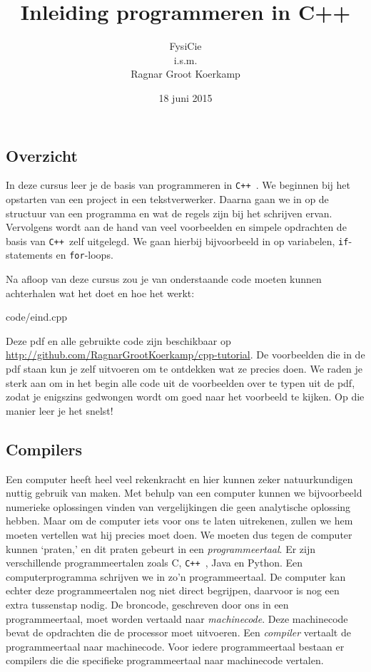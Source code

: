 \documentclass[12pt,a4paper]{article}
\title{Inleiding programmeren in C++}
\author{
FysiCie\\
i.s.m.\\
Ragnar Groot Koerkamp
}
\date{18 juni 2015}
\newcommand{\code}{}
\newcommand{\icode}{\lstinline}
\newcommand{\mono}{\texttt}
\newcommand{\cpp}{\mono{C++ }}
\begin{document}
 
\maketitle

\tableofcontents

\clearpage
\subsection{Overzicht}
In deze cursus leer je de basis van programmeren in \cpp. We beginnen bij het opstarten van een project in een tekstverwerker. Daarna gaan we in op de structuur van een programma en wat de regels zijn bij het schrijven ervan. Vervolgens wordt aan de hand van veel voorbeelden en simpele opdrachten de basis van \cpp zelf	 uitgelegd. We gaan hierbij bijvoorbeeld in op variabelen, \icode{if}-statements en \icode{for}-loops.

Na afloop van deze cursus zou je van onderstaande code moeten kunnen achterhalen wat het doet en hoe het werkt:

\code{code/eind.cpp}

Deze pdf en alle gebruikte code zijn beschikbaar op \url{http://github.com/RagnarGrootKoerkamp/cpp-tutorial}. De voorbeelden die in de pdf staan kun je zelf uitvoeren om te ontdekken wat ze precies doen. We raden je sterk aan om in het begin alle code uit de voorbeelden over te typen uit de pdf, zodat je enigszins gedwongen wordt om goed naar het voorbeeld te kijken. Op die manier leer je het snelst! 

\subsection{Compilers}
Een computer heeft heel veel rekenkracht en hier kunnen zeker natuurkundigen nuttig gebruik van maken. Met behulp van een computer kunnen we bijvoorbeeld numerieke oplossingen vinden van vergelijkingen die geen analytische oplossing hebben. Maar om de computer iets voor ons te laten uitrekenen, zullen we hem moeten vertellen wat hij precies moet doen. We moeten dus tegen de computer kunnen `praten,' en dit praten gebeurt in een \emph{programmeertaal}. Er zijn verschillende programmeertalen zoals C, {\cpp,} Java en Python. Een computerprogramma schrijven we in zo'n programmeertaal. De computer kan echter deze programmeertalen nog niet direct begrijpen, daarvoor is nog een extra tussenstap nodig. De broncode, geschreven door ons in een programmeertaal, moet worden vertaald naar \emph{machinecode}. Deze machinecode bevat de opdrachten die de processor moet uitvoeren. Een \emph{compiler} vertaalt de programmeertaal naar machinecode. Voor iedere programmeertaal bestaan er compilers die die specifieke programmeertaal naar machinecode vertalen.
\end{document}
